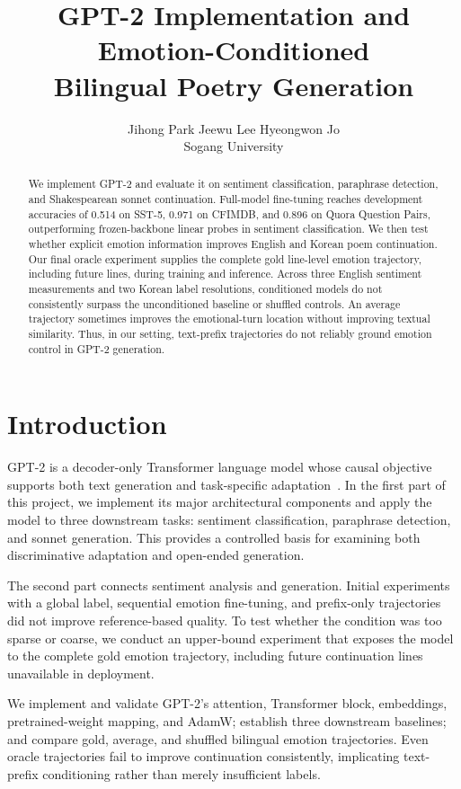 \documentclass{article}
\title{GPT-2 Implementation and Emotion-Conditioned\\
Bilingual Poetry Generation}
\author{Jihong Park \quad Jeewu Lee \quad Hyeongwon Jo \\
Sogang University}
\begin{document}
\maketitle
\fancyhead{}

\begin{abstract}
We implement GPT-2 and evaluate it on sentiment classification, paraphrase detection, and Shakespearean sonnet continuation. Full-model fine-tuning reaches development accuracies of 0.514 on SST-5, 0.971 on CFIMDB, and 0.896 on Quora Question Pairs, outperforming frozen-backbone linear probes in sentiment classification. We then test whether explicit emotion information improves English and Korean poem continuation. Our final oracle experiment supplies the complete gold line-level emotion trajectory, including future lines, during training and inference. Across three English sentiment measurements and two Korean label resolutions, conditioned models do not consistently surpass the unconditioned baseline or shuffled controls. An average trajectory sometimes improves the emotional-turn location without improving textual similarity. Thus, in our setting, text-prefix trajectories do not reliably ground emotion control in GPT-2 generation.
\end{abstract}

\section{Introduction}

GPT-2 is a decoder-only Transformer language model whose causal objective supports both text generation and task-specific adaptation~\citep{radford2019language,vaswani2017attention}. In the first part of this project, we implement its major architectural components and apply the model to three downstream tasks: sentiment classification, paraphrase detection, and sonnet generation. This provides a controlled basis for examining both discriminative adaptation and open-ended generation.

The second part connects sentiment analysis and generation. Initial experiments with a global label, sequential emotion fine-tuning, and prefix-only trajectories did not improve reference-based quality. To test whether the condition was too sparse or coarse, we conduct an upper-bound experiment that exposes the model to the complete gold emotion trajectory, including future continuation lines unavailable in deployment.

We implement and validate GPT-2's attention, Transformer block, embeddings, pretrained-weight mapping, and AdamW; establish three downstream baselines; and compare gold, average, and shuffled bilingual emotion trajectories. Even oracle trajectories fail to improve continuation consistently, implicating text-prefix conditioning rather than merely insufficient labels.
\end{document}
